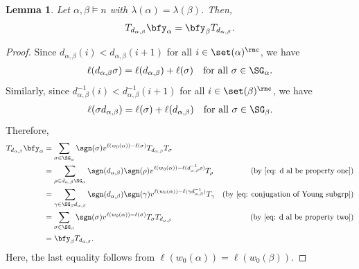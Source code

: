 \documentclass[12pt, reqno]{amsart}
\theoremstyle{plain}
\newtheorem{lemma}[lemma]{Lemma}
\theoremstyle{definition}
\numberwithin{equation}{section}
\numberwithin{figure}{section}
\numberwithin{table}{section}
\begin{document}
\begin{lemma}\label{lem: T y and y T}
Let $\alpha, \beta \models n$ with $\lambda(\alpha) = \lambda(\beta)$.
Then,
\begin{align*}
T_{d_{\alpha,\beta}}\bfy_\alpha
    =
    \bfy_\beta T_{d_{\alpha,\beta}}.
\end{align*}
\end{lemma}
\begin{proof}
Since 
$d_{\alpha, \beta}(i) < d_{\alpha, \beta}(i+1)$ for all $i \in \set(\alpha)^\rmc$, we have 
\begin{align}\label{eq: d al be property one}
\ell(d_{\alpha, \beta} \sigma) = \ell(d_{\alpha, \beta}) + \ell(\sigma) \quad\text{for all $\sigma \in \SG_{\alpha}$}.
\end{align}
Similarly, since $d_{\alpha, \beta}^{-1}(i) < d_{\alpha, \beta}^{-1}(i+1)$ for all $i \in \set(\beta)^\rmc$, we have
\begin{align}\label{eq: d al be property two}
\ell(\sigma d_{\alpha, \beta}) = \ell(\sigma) + \ell(d_{\alpha,\beta}) \quad\text{for all $\sigma \in \SG_{\beta}$}.
\end{align}
Therefore, 
\begin{align*}
   T_{d_{\alpha, \beta}} \bfy_{\alpha} 
   &= \sum_{\sigma \in \SG_{\alpha}} \sgn(\sigma)v^{\ell(w_0(\alpha)) - \ell(\sigma)}  T_{d_{\alpha, \beta}}T_{\sigma}\\
   &= \sum_{\rho \in d_{\alpha, \beta}\SG_{\alpha}} \sgn(d_{\alpha, \beta})\sgn(\rho)v^{\ell(w_0(\alpha)) - \ell(d_{\alpha,\beta}^{-1} \rho)} T_{\rho} & \text{(by \cref{eq: d al be property one})}\\
   &= \sum_{\gamma \in \SG_{\beta}d_{\alpha, \beta}} \sgn(d_{\alpha, \beta})\sgn(\gamma)v^{\ell(w_0(\alpha)) - \ell(\gamma d_{\alpha, \beta}^{-1})} T_{\gamma} & \text{(by \cref{eq: conjugation of Young subgrp})}\\
   &=  \sum_{\sigma \in \SG_{\beta}} \sgn(\sigma)v^{\ell(w_0(\alpha)) - \ell(\sigma)} T_{\sigma}T_{d_{\alpha, \beta}} & \text{(by \cref{eq: d al be property two})}\\
   &= \bfy_{\beta} T_{d_{\alpha,\beta}}.
\end{align*}
Here, the last equality follows from   $\ell(w_0(\alpha)) = \ell(w_0(\beta))$.
\end{proof}
\end{document}
